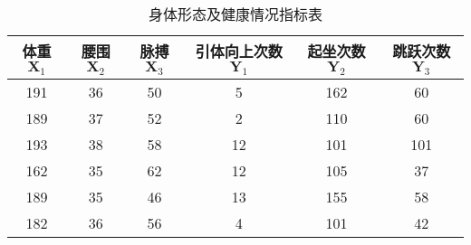 \documentclass[withoutpreface]{cumcmthesis}
\begin{document}
\begin{table}[H]
    \centering
    \caption{身体形态及健康情况指标表}\label{Tab:1}
    \begin{tabular}{|c|c|c|c|c|c|}
        \hline
        \rowcolor[rgb]{ .867,  .922,  .969} 体重$\mathbf{X}_1$ & 腰围$\mathbf{X}_2$ & 脉搏$\mathbf{X}_3$ & \cellcolor[rgb]{ .886,  .937,  .855}引体向上次数$\mathbf{Y}_1$ & \cellcolor[rgb]{ .886,  .937,  .855}起坐次数$\mathbf{Y}_2$ & \cellcolor[rgb]{ .886,  .937,  .855}跳跃次数$\mathbf{Y}_3$\bigstrut \\
        \hline
        \rowcolor[rgb]{ .867,  .922,  .969} 191              & 36               & 50               & \cellcolor[rgb]{ .886,  .937,  .855}5                    & \cellcolor[rgb]{ .886,  .937,  .855}162                & \cellcolor[rgb]{ .886,  .937,  .855}60 \bigstrut                \\
        \hline
        \rowcolor[rgb]{ .867,  .922,  .969} 189              & 37               & 52               & \cellcolor[rgb]{ .886,  .937,  .855}2                    & \cellcolor[rgb]{ .886,  .937,  .855}110                & \cellcolor[rgb]{ .886,  .937,  .855}60 \bigstrut                \\
        \hline
        \rowcolor[rgb]{ .867,  .922,  .969} 193              & 38               & 58               & \cellcolor[rgb]{ .886,  .937,  .855}12                   & \cellcolor[rgb]{ .886,  .937,  .855}101                & \cellcolor[rgb]{ .886,  .937,  .855}101 \bigstrut               \\
        \hline
        \rowcolor[rgb]{ .867,  .922,  .969} 162              & 35               & 62               & \cellcolor[rgb]{ .886,  .937,  .855}12                   & \cellcolor[rgb]{ .886,  .937,  .855}105                & \cellcolor[rgb]{ .886,  .937,  .855}37 \bigstrut                \\
        \hline
        \rowcolor[rgb]{ .867,  .922,  .969} 189              & 35               & 46               & \cellcolor[rgb]{ .886,  .937,  .855}13                   & \cellcolor[rgb]{ .886,  .937,  .855}155                & \cellcolor[rgb]{ .886,  .937,  .855}58 \bigstrut                \\
        \hline
        \rowcolor[rgb]{ .867,  .922,  .969} 182              & 36               & 56               & \cellcolor[rgb]{ .886,  .937,  .855}4                    & \cellcolor[rgb]{ .886,  .937,  .855}101                & \cellcolor[rgb]{ .886,  .937,  .855}42 \bigstrut                \\
        \hline

\end{tabular}
\end{table}
\end{document}
